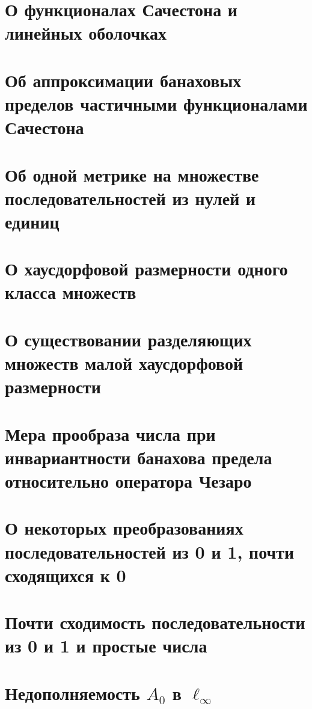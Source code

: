\documentclass[a4paper,openbib]{report}
\theoremstyle{definition}
\newcommand\hypotlist{ }
\begin{document}
	\section{О функционалах Сачестона и линейных оболочках}
	
	

	\section{Об аппроксимации банаховых пределов частичными функционалами Сачестона}
	

	\section{Об одной метрике на множестве последовательностей из нулей и единиц}
	

	\section{О хаусдорфовой размерности одного класса множеств}
	

	\section{О существовании разделяющих множеств малой хаусдорфовой размерности}
	

	\section{Мера прообраза числа при инвариантности банахова предела относительно оператора Чезаро}
	

	\section{О некоторых преобразованиях последовательностей из 0 и 1, почти сходящихся к 0}
	

	\section{Почти сходимость последовательности из 0 и 1 и простые числа}
	

	\section{Недополняемость $A_0$ в $\ell_\infty$}
	



\renewcommand\label[1]{}


\printbibliography{}
\end{document}
